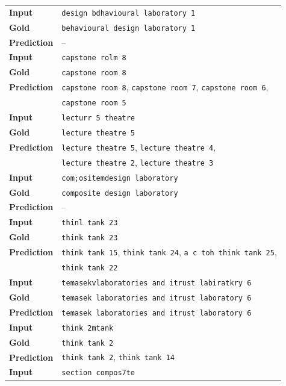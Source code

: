 \documentclass{article}
\theoremstyle{definition}
\begin{document}
\begin{table}[H]
	\centering
	\begin{tabularx}{\linewidth}{lX}
		\toprule
		\textbf{Input} & \texttt{design bdhavioural laboratory 1} \\
		\textbf{Gold} & \texttt{behavioural design laboratory 1} \\
		\textbf{Prediction} & -- \\
		\midrule
		\textbf{Input} & \texttt{capstone rolm 8} \\
		\textbf{Gold} & \texttt{capstone room 8} \\
		\textbf{Prediction} & \texttt{capstone room 8}, \texttt{capstone room 7}, \texttt{capstone room 6}, \\
		& \texttt{capstone room 5} \\
		\midrule
		\textbf{Input} & \texttt{lecturr 5 theatre} \\
		\textbf{Gold} & \texttt{lecture theatre 5} \\
		\textbf{Prediction} & \texttt{lecture theatre 5}, \texttt{lecture theatre 4}, \\
		& \texttt{lecture theatre 2}, \texttt{lecture theatre 3} \\
		\midrule
		\textbf{Input} & \texttt{com;ositemdesign laboratory} \\
		\textbf{Gold} & \texttt{composite design laboratory} \\
		\textbf{Prediction} & -- \\
		\midrule
		\textbf{Input} & \texttt{thinl tank 23} \\
		\textbf{Gold} & \texttt{think tank 23} \\
		\textbf{Prediction} & \texttt{think tank 15}, \texttt{think tank 24}, \texttt{a c toh think tank 25}, \\
		& \texttt{think tank 22} \\
		\midrule
		\textbf{Input} & \texttt{temasekvlaboratories and itrust labiratkry 6} \\
		\textbf{Gold} & \texttt{temasek laboratories and itrust laboratory 6} \\
		\textbf{Prediction} & \texttt{temasek laboratories and itrust laboratory 6} \\
		\midrule
		\textbf{Input} & \texttt{think 2mtank} \\
		\textbf{Gold} & \texttt{think tank 2} \\
		\textbf{Prediction} & \texttt{think tank 2}, \texttt{think tank 14} \\
		\midrule
		\textbf{Input} & \texttt{section compos7te} \\

\end{tabularx}
\end{table}
\end{document}

